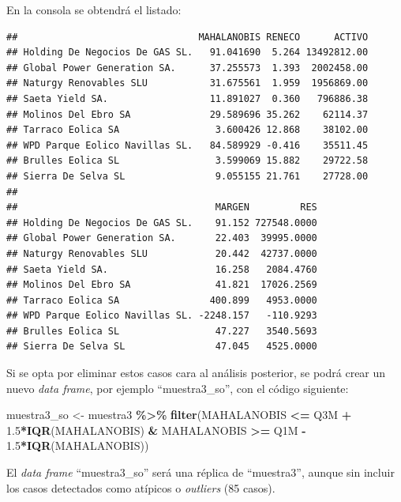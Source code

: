 \documentclass[
]{book}
\newenvironment{Shaded}{\begin{snugshade}}{\end{snugshade}}
\newcommand{\FloatTok}[1]{\textcolor[rgb]{0.00,0.00,0.81}{#1}}
\newcommand{\FunctionTok}[1]{\textcolor[rgb]{0.13,0.29,0.53}{\textbf{#1}}}
\newcommand{\NormalTok}[1]{#1}
\newcommand{\OtherTok}[1]{\textcolor[rgb]{0.56,0.35,0.01}{#1}}
\newcommand{\SpecialCharTok}[1]{\textcolor[rgb]{0.81,0.36,0.00}{\textbf{#1}}}
\begin{document}
En la consola se obtendrá el listado:

\begin{verbatim}
##                                MAHALANOBIS RENECO      ACTIVO
## Holding De Negocios De GAS SL.   91.041690  5.264 13492812.00
## Global Power Generation SA.      37.255573  1.393  2002458.00
## Naturgy Renovables SLU           31.675561  1.959  1956869.00
## Saeta Yield SA.                  11.891027  0.360   796886.38
## Molinos Del Ebro SA              29.589696 35.262    62114.37
## Tarraco Eolica SA                 3.600426 12.868    38102.00
## WPD Parque Eolico Navillas SL.   84.589929 -0.416    35511.45
## Brulles Eolica SL                 3.599069 15.882    29722.58
## Sierra De Selva SL                9.055155 21.761    27728.00
## 
##                                   MARGEN         RES
## Holding De Negocios De GAS SL.    91.152 727548.0000
## Global Power Generation SA.       22.403  39995.0000
## Naturgy Renovables SLU            20.442  42737.0000
## Saeta Yield SA.                   16.258   2084.4760
## Molinos Del Ebro SA               41.821  17026.2569
## Tarraco Eolica SA                400.899   4953.0000
## WPD Parque Eolico Navillas SL. -2248.157   -110.9293
## Brulles Eolica SL                 47.227   3540.5693
## Sierra De Selva SL                47.045   4525.0000
\end{verbatim}

Si se opta por eliminar estos casos cara al análisis posterior, se podrá crear un nuevo \emph{data frame}, por ejemplo ``muestra3\_so'', con el código siguiente:

\begin{Shaded}
\begin{Highlighting}[]
\NormalTok{muestra3\_so }\OtherTok{\textless{}{-}}\NormalTok{ muestra3 }\SpecialCharTok{\%\textgreater{}\%}
  \FunctionTok{filter}\NormalTok{(MAHALANOBIS }\SpecialCharTok{\textless{}=}\NormalTok{ Q3M }\SpecialCharTok{+} \FloatTok{1.5}\SpecialCharTok{*}\FunctionTok{IQR}\NormalTok{(MAHALANOBIS) }\SpecialCharTok{\&}
\NormalTok{           MAHALANOBIS }\SpecialCharTok{\textgreater{}=}\NormalTok{ Q1M }\SpecialCharTok{{-}} \FloatTok{1.5}\SpecialCharTok{*}\FunctionTok{IQR}\NormalTok{(MAHALANOBIS))}
\end{Highlighting}
\end{Shaded}

El \emph{data frame} ``muestra3\_so'' será una réplica de ``muestra3'', aunque sin incluir los casos detectados como atípicos o \emph{outliers} (85 casos).
\end{document}
